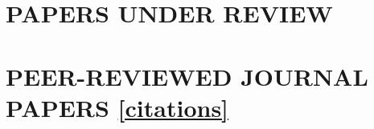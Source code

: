 \documentclass[paper=a4,fontsize=11pt]{scrartcl} %
\newcommand{\NewPart}[2]{\section*{\uppercase{#1} #2}}
\begin{document}

\newpage


\NewPart{Papers under Review}{}{}






 

\begin{etaremune}

\item {}

\item {}

\item {}

\item {}

\item {}

\item {}


\end{etaremune}


\NewPart{Peer-Reviewed Journal Papers}{\href{https://scholar.google.de/citations?user=RzdZi_IAAAAJ&hl=de}{[citations]}}
\end{document}
